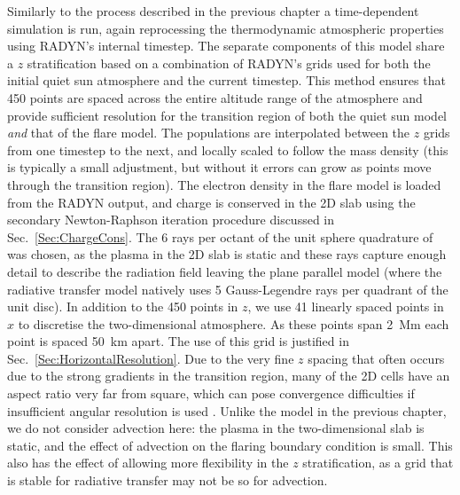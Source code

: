 Similarly to the process described in the previous chapter a time-dependent simulation is run, again reprocessing the thermodynamic atmospheric properties using RADYN's internal timestep.
The separate components of this model share a $z$ stratification based on a combination of RADYN's grids used for both the initial quiet sun atmosphere and the current timestep.
This method ensures that 450 points are spaced across the entire altitude range of the atmosphere and provide sufficient resolution for the transition region of both the quiet sun model \emph{and} that of the flare model.
The populations  are interpolated between the $z$ grids from one timestep to the next, and locally scaled to follow the mass density (this is typically a small adjustment, but without it errors can grow as points move through the transition region).
The electron density in the flare model is loaded from the RADYN output, and charge is conserved in the 2D slab using the secondary Newton-Raphson iteration procedure discussed in Sec.~\ref{Sec:ChargeCons}.
The 6 rays per octant of the unit sphere quadrature of \citet{Stepan2020} was chosen, as the plasma in the 2D slab is static and these rays capture enough detail to describe the radiation field leaving the plane parallel model (where the radiative transfer model natively uses 5 Gauss-Legendre rays per quadrant of the unit disc).
In addition to the 450 points in $z$, we use 41 linearly spaced points in $x$ to discretise the two-dimensional atmosphere.
As these points span \SI{2}{\mega\metre} each point is spaced \SI{50}{\kilo\metre} apart.
The use of this grid is justified in Sec.~\ref{Sec:HorizontalResolution}.
Due to the very fine $z$ spacing that often occurs due to the strong gradients in the transition region, many of the 2D cells have an aspect ratio very far from square, which can pose convergence difficulties if insufficient angular resolution is used .
Unlike the model in the previous chapter, we do not consider advection here: the plasma in the two-dimensional slab is static, and the effect of advection on the flaring boundary condition is small.
This also has the effect of allowing more flexibility in the $z$ stratification, as a grid that is stable for radiative transfer may not be so for advection.

